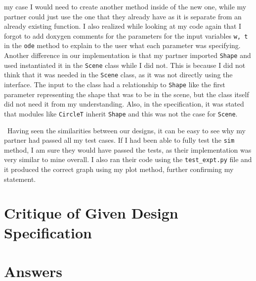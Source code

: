\documentclass[12pt]{article}
\begin{document}
my case I would need to create another method inside of the new one, while my partner could just
use the one that they already have as it is separate from an already existing function. I also 
realized while looking at my code again that I forgot to add doxygen comments for the parameters 
for the input variables \verb|w, t| in the \verb|ode| method to explain to the user what each 
parameter was specifying. Another difference in our implementation is that my partner imported 
\verb|Shape| and used instantiated it in the \verb|Scene| class while I did not. This is because 
I did not think that it was needed in the \verb|Scene| class, as it was not directly using the 
interface. The input to the class had a relationship to \verb|Shape| like the first parameter 
representing the shape that was to be in the scene, but the class itself did not need it from my 
understanding. Also, in the specification, it was stated that modules like \verb|CircleT| inherit 
\verb|Shape| and this was not the case for \verb|Scene|. 

~\newline\noindent Having seen the similarities between our designs, it can be easy to see why my 
partner had passed all my test cases. If I had been able to fully test the \verb|sim| method, I 
am sure they would have passed the tests, as their implementation was very similar to mine 
overall. I also ran their code using the \verb|test_expt.py| file and it produced the correct 
graph using my plot method, further confirming my statement. 

\section{Critique of Given Design Specification}






\section{Answers}
\end{document}

